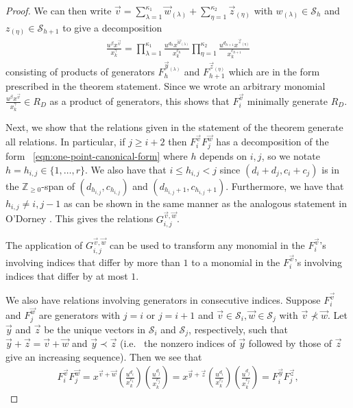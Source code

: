 \documentclass{amsart}
\theoremstyle{plain}
\theoremstyle{definition}
\theoremstyle{remark}
\numberwithin{equation}{section}
\newcommand\bz{{\mathbb Z}}
\newcommand\mss{\mathscr{S}}
\begin{document}
\begin{proof}
\noindent
We can then write $\vec{v}  = \sum_{\lambda=1}^{\kappa_1}\vec{w}_{(\lambda)} +
\sum_{\eta=1}^{\kappa_2} \vec z_{(\eta)}$ with $w_{(\lambda)} \in \mss_h$ and
$z_{(\eta)} \in \mss_{h+1}$ to give a decomposition
\begin{align}
\label{eqn:one-point-canonical-form}
	\frac{u^{\beta} x^{\vec{v}}} {x_k^{\gamma}}	= \prod_{\lambda = 1}
	^{\kappa_1} \frac{u^{d_h} x^{\vec{w}_{(\lambda)}}} {x_k^{c_h}}
	\prod_{\eta = 1}^{\kappa_2} \frac{u^{d_{h + 1}} x^{\vec{z}_{(\eta)}}}
	{x_k^{c_{h + 1}}}
\end{align}
\noindent
consisting of products of generators $F_h^{\vec{y}_{(\lambda)}}$
and $F_{h + 1}^{\vec{z}_{(\eta)}}$ which are in the form
prescribed in the theorem statement. Since we wrote an arbitrary monomial
$\frac{u^{\beta} x^{\vec{v}}}{x_k^\gamma} \in R_D$ as a product of generators,
this shows that $F_i^{\vec v}$ minimally generate $R_D$.

Next, we show that the relations given in the statement of the theorem generate all relations. 
In particular, if $j \geq i + 2$ then $F_i^{\vec{v}} F_j^{\vec{w}}$
has a decomposition of the form ~\eqref{eqn:one-point-canonical-form} where $h$
depends on $i, j$, so we notate $h = h_{i, j} \in \{1, \ldots, r\}$. We also
have
that $i \leq h_{i, j} < j$ since $(d_i + d_j, c_i + c_j)$ is in the
$\bz_{\geq 0}$-span of $(d_{h_{i, j}}, c_{h_{i, j}})$ and
$(d_{h_{i, j} + 1}, c_{h_{i, j} + 1})$. Furthermore, we have that
$h_{i, j} \neq i, j-1$ as can be shown in the same manner as the analogous statement in O'Dorney
\cite[Theorem 6]{dorney:canonical}. This gives the relations
$G_{i, j}^{\vec{v}, \vec{w}}$.

The application of $G_{i, j}^{\vec{v}, \vec{w}}$ can be used
to transform any monomial in the $F_i^{\vec{v}}$'s involving
indices that differ by more than $1$ to a monomial in the $F_i
^{\vec{v}}$'s involving indices that differ by at most $1$.

We also have relations involving generators in consecutive
indices. Suppose $F_i^{\vec{v}}$ and $F_j^{\vec{w}}$ are
generators with $j = i$ or $j = i + 1$ and $\vec{v} \in
\mss_i, \vec{w} \in \mss_j$ with $\vec{v} \not\prec \vec{w}$.
Let $\vec{y}$ and $\vec{z}$ be the unique vectors in $\mss_i$ and
$\mss_j$, respectively, such that $\vec{y} + \vec{z} = \vec{v} +
\vec{w}$ and $\vec{y} \prec \vec{z}$ (i.e.~ the nonzero indices
of $\vec{y}$ followed by those of $\vec{z}$ give an increasing
sequence). Then we see that
\begin{align*}
	F_i^{\vec{v}} F_j^{\vec{w}} = x^{\vec{v} + \vec{w}}
	\left(\frac{u^{d_i}}{x_k^{c_i}}\right)
	\left(\frac{u^{d_j}}{x_k^{c_j}}\right)
	= x^{\vec{y} + \vec{z}}
	\left(\frac{u^{d_i}}{x_k^{c_i}}\right)
	\left(\frac{u^{d_j}}{x_k^{c_j}}\right)
	= F_i^{\vec{y}} F_j^{\vec{z}},
\end{align*}


\end{proof}
\end{document}

